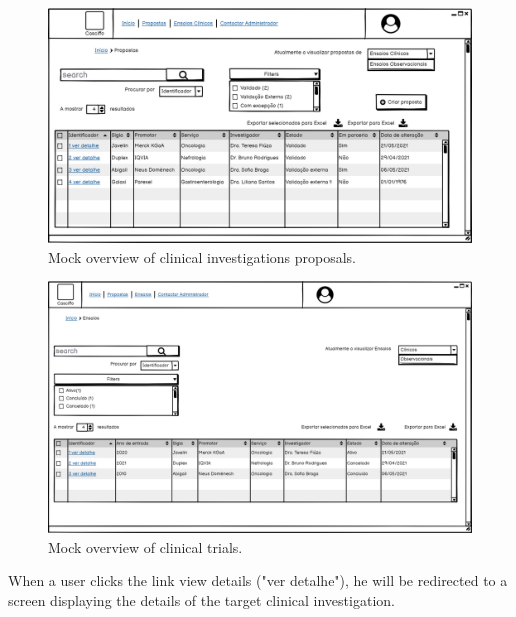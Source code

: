 \begin{figure}[H]
    \centering
    \includegraphics[scale=0.35]{Chapters/img/propostas/proposals.png}
    \caption{Mock overview of clinical investigations proposals.}
    \label{fig:propostas}
\end{figure}

\begin{figure}[H]
    \centering
    \includegraphics[scale=0.35]{Chapters/img/ensaios/ensaios.png}
    \caption{Mock overview of clinical trials.}
    \label{fig:ensaios}
\end{figure}


When a user clicks the link view details ("ver detalhe"), he will be redirected to a screen displaying the details of the target clinical investigation.

